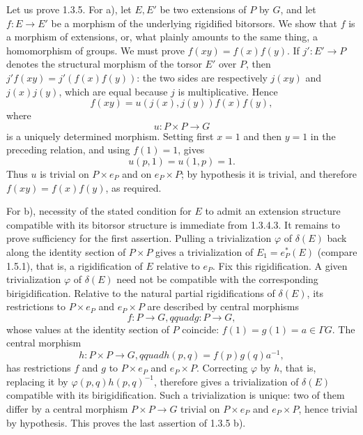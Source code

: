 Let us prove 1.3.5. For a), let $E,E'$ be two extensions of $P$ by $G$,
and let $f:E\longrightarrow E'$ be a morphism of the underlying
rigidified bitorsors. We show that $f$ is a morphism of extensions, or,
what plainly amounts to the same thing, a homomorphism of groups. We
must prove $f(xy)=f(x)f(y)$. If $j':E'\longrightarrow P$ denotes the
structural morphism of the torsor $E'$ over $P$, then
$j'f(xy)=j'(f(x)f(y))$: the two sides are respectively $j(xy)$ and
$j(x)j(y)$, which are equal because $j$ is multiplicative. Hence
\begin{equation*}
 f(xy)=u(j(x),j(y))f(x)f(y),
\end{equation*}
where
\begin{equation*}
 u:P\times P\longrightarrow G
\end{equation*}
is a uniquely determined morphism. Setting first $x=1$ and then $y=1$
in the preceding relation, and using $f(1)=1$, gives
\begin{equation*}
 u(p,1)=u(1,p)=1.
\end{equation*}
Thus $u$ is trivial on $P\times e_P$ and on $e_P\times P$; by
hypothesis it is trivial, and therefore $f(xy)=f(x)f(y)$, as required.

For b), necessity of the stated condition for $E$ to admit an
extension structure compatible with its bitorsor structure is immediate
from 1.3.4.3. It remains to prove sufficiency for the first assertion.
Pulling a trivialization $\varphi$ of $\delta(E)$ back along the
identity section of $P\times P$ gives a trivialization of
$E_1=e_P^*(E)$ (compare 1.5.1), that is, a rigidification of $E$
relative to $e_P$. Fix this rigidification. A given trivialization
$\varphi$ of $\delta(E)$ need not be compatible with the corresponding
birigidification. Relative to the natural partial rigidifications of
$\delta(E)$, its restrictions to $P\times e_P$ and $e_P\times P$ are
described by central morphisms
\begin{equation*}
 f:P\longrightarrow G,qquad g:P\longrightarrow G,
\end{equation*}
whose values at the identity section of $P$ coincide:
$f(1)=g(1)=a\in\Gamma G$. The central morphism
\begin{equation*}
 h:P\times P\longrightarrow G,qquad h(p,q)=f(p)g(q)a^{-1},
\end{equation*}
has restrictions $f$ and $g$ to $P\times e_P$ and $e_P\times P$.
Correcting $\varphi$ by $h$, that is, replacing it by
$\varphi(p,q)h(p,q)^{-1}$, therefore gives a trivialization of
$\delta(E)$ compatible with its birigidification. Such a trivialization
is unique: two of them differ by a central morphism
$P\times P\longrightarrow G$ trivial on $P\times e_P$ and
$e_P\times P$, hence trivial by hypothesis. This proves the last
assertion of 1.3.5 b).

